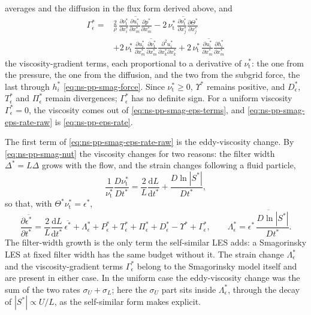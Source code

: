 \documentclass{article}
\begin{document}
averages and the diffusion in the flux form derived above, and
\begin{equation}\label{eq:ns-pp-smag-Gamma}
\begin{aligned}
  \Gamma_\epsilon^*
  ={}& \frac{2}{\rho}\, \overline{\frac{\partial \nu_{\mathrm{t}}^*}{\partial x_i^*} \frac{\partial u_i^*}{\partial x_m^*} \frac{\partial p^*}{\partial x_m^*}}
  - 2\, \overline{\nu_{\mathrm{t}}^*\, \frac{\partial \nu_{\mathrm{t}}^*}{\partial x_j^*} \frac{\partial \Theta^*}{\partial x_j^*}} \\
  &+ 2\, \overline{\nu_{\mathrm{t}}^*\, \frac{\partial u_i^*}{\partial x_m^*} \frac{\partial \nu_{\mathrm{t}}^*}{\partial x_m^*} \frac{\partial^2 u_i^*}{\partial x_k^* \partial x_k^*}}
  + 2\, \overline{\nu_{\mathrm{t}}^*\, \frac{\partial u_i^*}{\partial x_m^*} \frac{\partial h_i^*}{\partial x_m^*}}
\end{aligned}
\end{equation}
the viscosity-gradient terms, each proportional to a derivative of
$\nu_{\mathrm{t}}^*$: the one from the pressure, the one from the diffusion,
and the two from the subgrid force, the last through $h_i^*$
\eqref{eq:ns-pp-smag-force}. Since $\nu_{\mathrm{t}}^* \ge 0$,
$\Upsilon^*$ remains positive, and $D_\epsilon^*$, $T_\epsilon^*$ and
$\Pi_\epsilon^*$ remain divergences; $\Gamma_\epsilon^*$ has no definite
sign. For a uniform viscosity $\Gamma_\epsilon^* = 0$, the
viscosity comes out of \eqref{eq:ns-pp-smag-eps-terms}, and
\eqref{eq:ns-pp-smag-eps-rate-raw} is \eqref{eq:ns-pp-eps-rate}.
\par
The first term of \eqref{eq:ns-pp-smag-eps-rate-raw} is the eddy-viscosity
change. By \eqref{eq:ns-pp-smag-nut} the viscosity changes for two reasons:
the filter width $\Delta^* = L\Delta$ grows with the flow, and the strain
changes following a fluid particle,
\begin{equation}\label{eq:ns-pp-smag-nut-rate}
  \frac{1}{\nu_{\mathrm{t}}^*} \frac{D \nu_{\mathrm{t}}^*}{D t^*}
  = \frac{2}{L}\frac{\mathrm{d} L}{\mathrm{d} t^*}
  + \frac{D \ln |S^*|}{D t^*} ,
\end{equation}
so that, with $\Theta^* \nu_{\mathrm{t}}^* = \epsilon^*$,
\begin{equation}\label{eq:ns-pp-smag-eps-rate}
  \frac{\partial \overline{\epsilon^*}}{\partial t^*}
  = \frac{2}{L}\frac{\mathrm{d} L}{\mathrm{d} t^*}\, \overline{\epsilon^*}
  + \Lambda_\epsilon^*
  + P_\epsilon^* + T_\epsilon^* + \Pi_\epsilon^* + D_\epsilon^* - \Upsilon^*
  + \Gamma_\epsilon^* ,
  \qquad
  \Lambda_\epsilon^* = \overline{\epsilon^*\, \frac{D \ln |S^*|}{D t^*}} .
\end{equation}
The filter-width growth is the only term the self-similar LES adds: a
Smagorinsky LES at fixed filter width has the same budget without it. The
strain change $\Lambda_\epsilon^*$ and the viscosity-gradient terms
$\Gamma_\epsilon^*$ belong to the Smagorinsky model itself and are present
in either case. In the uniform case the eddy-viscosity change was the sum of
the two rates $\sigma_U + \sigma_L$; here the $\sigma_U$ part sits inside
$\Lambda_\epsilon^*$, through the decay of $|S^*| \propto U/L$, as the
self-similar form makes explicit.
\end{document}
